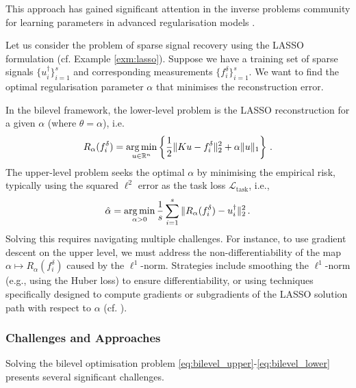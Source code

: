 This approach has gained significant attention in the inverse problems community for learning parameters in advanced regularisation models \cite{kunisch2013bilevel, delosreyes2016learning, holler2018bilevel, calatroni2022optimality}.

\begin{exm}\normalfont
Let us consider the problem of sparse signal recovery using the LASSO formulation (cf. Example \ref{exm:lasso}). Suppose we have a training set of sparse signals $\{u_i^\dagger\}_{i=1}^s$ and corresponding measurements $\{f_i^\delta\}_{i=1}^s$. We want to find the optimal regularisation parameter $\alpha$ that minimises the reconstruction error.

In the bilevel framework, the lower-level problem is the LASSO reconstruction for a given $\alpha$ (where $\theta = \alpha$), i.e.
\begin{align*}
    R_\alpha(f_i^\delta) = \operatorname*{arg\,min}_{u \in \mathbb{R}^n} \left\{ \frac{1}{2}\|K u - f_i^\delta\|_2^2 + \alpha \|u\|_1 \right\} \, .
\end{align*}
The upper-level problem seeks the optimal $\alpha$ by minimising the empirical risk, typically using the squared $\ell^2$ error as the task loss $\mathcal{L}_{\text{task}}$, i.e.,
\begin{align*}
    \hat{\alpha} = \operatorname*{arg\,min}_{\alpha > 0} \frac{1}{s} \sum_{i=1}^s \|R_\alpha(f_i^\delta) - u_i^\dagger\|_2^2 \, .
\end{align*}
Solving this requires navigating multiple challenges. For instance, to use gradient descent on the upper level, we must address the non-differentiability of the map $\alpha \mapsto R_\alpha(f_i^\delta)$ caused by the $\ell^1$-norm. Strategies include smoothing the $\ell^1$-norm (e.g., using the Huber loss) to ensure differentiability, or using techniques specifically designed to compute gradients or subgradients of the LASSO solution path with respect to $\alpha$ (cf. \cite{mairal2012task}).
\end{exm}

\subsubsection*{Challenges and Approaches}
Solving the bilevel optimisation problem \eqref{eq:bilevel_upper}-\eqref{eq:bilevel_lower} presents several significant challenges.

